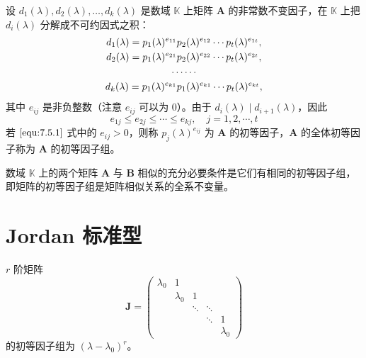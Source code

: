 \begin{definition}
    设 $d_{1}(\lambda), d_{2}(\lambda), \ldots, d_{k}(\lambda)$ 是数域 $\mathbb{K}$ 上矩阵 $\bm{A}$ 的非常数不变因子，在 $\mathbb{K}$ 上把 $d_{i}(\lambda)$ 分解成不可约因式之积：
    \begin{gather}
        d_{1}(\lambda) = p_{1}(\lambda)^{e_{11}}p_{2}(\lambda)^{e_{12}}\cdots p_{t}(\lambda)^{e_{1t}},\notag \\
        d_{2}(\lambda) = p_{1}(\lambda)^{e_{21}}p_{2}(\lambda)^{e_{22}}\cdots p_{t}(\lambda)^{e_{2t}},\notag \\
        \cdots \cdots                                                                                        \\
        d_{k}(\lambda) = p_{1}(\lambda)^{e_{k1}}p_{1}(\lambda)^{e_{k1}}\cdots p_{t}(\lambda)^{e_{kt}},\notag
    \end{gather}\label{equ:7.5.1}
    其中 $e_{ij}$ 是非负整数（注意 $e_{ij}$ 可以为 $0$）。由于 $d_{i}(\lambda) \mid d_{i + 1}(\lambda)$，因此
    \[
        e_{1j} \leqslant e_{2j} \leqslant \cdots \leqslant e_{kj},\quad j = 1, 2, \cdots, t
    \]
    若 $\ref{equ:7.5.1}$ 式中的 $e_{ij} > 0$，则称 $p_{j}(\lambda)^{e_{ij}}$ 为 $\bm{A}$ 的初等因子，$\bm{A}$ 的全体初等因子称为 $\bm{A}$ 的初等因子组。
\end{definition}

\begin{theorem}
    数域 $\mathbb{K}$ 上的两个矩阵 $\bm{A}$ 与 $\bm{B}$ 相似的充分必要条件是它们有相同的初等因子组，即矩阵的初等因子组是矩阵相似关系的全系不变量。
\end{theorem}




\section{Jordan 标准型}

\begin{lemma}
    $r$ 阶矩阵
    \begin{equation}
        \bm{J} = \begin{pmatrix}
            \lambda_0 & 1         & \      & \      & \         \\
            \         & \lambda_0 & 1      & \      & \         \\
            \         & \         & \ddots & \ddots & \         \\
            \         & \         & \      & \ddots & 1         \\
            \         & \         & \      & \      & \lambda_0
        \end{pmatrix}\label{equ:7.6.1}
    \end{equation}
    的初等因子组为 $(\lambda - \lambda_0)^r$。
\end{lemma}

